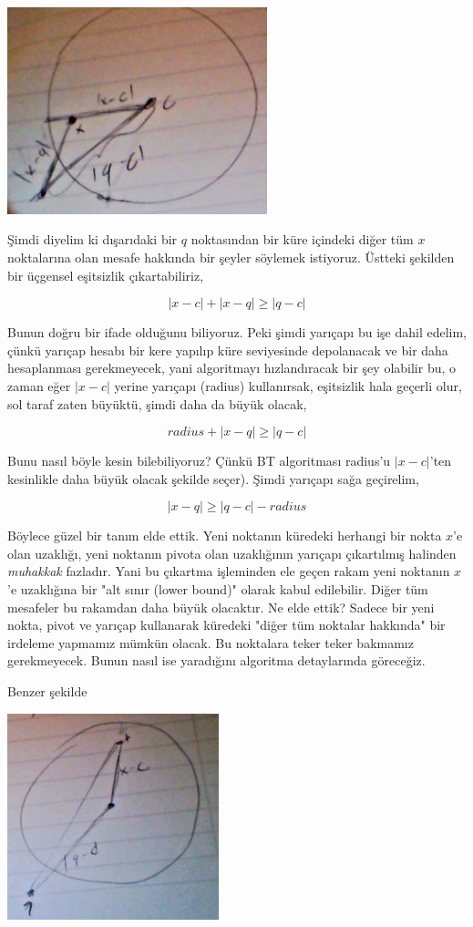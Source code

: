 \documentclass[12pt,fleqn]{article}\usepackage{../../common}
\begin{document}
\includegraphics[height=6cm]{tri1.jpg}

Şimdi diyelim ki dışarıdaki bir $q$ noktasından bir küre içindeki diğer tüm
$x$ noktalarına olan mesafe hakkında bir şeyler söylemek istiyoruz. Üstteki
şekilden bir üçgensel eşitsizlik çıkartabiliriz,

$$ |x-c| + |x-q| \ge |q-c|  $$

Bunun doğru bir ifade olduğunu biliyoruz. Peki şimdi yarıçapı bu işe dahil
edelim, çünkü yarıçap hesabı bir kere yapılıp küre seviyesinde depolanacak
ve bir daha hesaplanması gerekmeyecek, yani algoritmayı hızlandıracak bir
şey olabilir bu, o zaman eğer $|x-c|$ yerine yarıçapı (radius) kullanırsak,
eşitsizlik hala geçerli olur, sol taraf zaten büyüktü, şimdi daha da büyük
olacak, 

$$ radius + |x-q| \ge |q-c|  $$

Bunu nasıl böyle kesin bilebiliyoruz? Çünkü BT algoritması radius'u
$|x-c|$'ten kesinlikle daha büyük olacak şekilde seçer). Şimdi yarıçapı
sağa geçirelim,

$$ |x-q| \ge |q-c| - radius $$

Böylece güzel bir tanım elde ettik. Yeni noktanın küredeki herhangi bir
nokta $x$'e olan uzaklığı, yeni noktanın pivota olan uzaklığının yarıçapı
çıkartılmış halinden {\em muhakkak} fazladır. Yani bu çıkartma işleminden
ele geçen rakam yeni noktanın $x$'e uzaklığına bir "alt sınır (lower
bound)" olarak kabul edilebilir. Diğer tüm mesafeler bu rakamdan daha büyük
olacaktır. Ne elde ettik? Sadece bir yeni nokta, pivot ve yarıçap
kullanarak küredeki "diğer tüm noktalar hakkında" bir irdeleme yapmamız
mümkün olacak. Bu noktalara teker teker bakmamız gerekmeyecek. Bunun nasıl
ise yaradığını algoritma detaylarında göreceğiz.

Benzer şekilde 

\includegraphics[height=6cm]{tri2.jpg}
\end{document}
